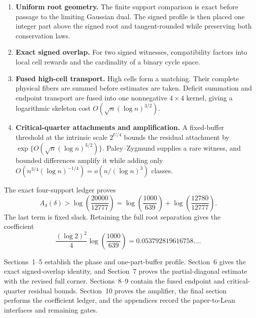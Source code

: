 \begin{enumerate}
\item \textbf{Uniform root geometry.} The finite support comparison is exact
before passage to the limiting Gaussian dual. The signed profile is then
placed one integer part above the signed root and tangent-rounded while
preserving both conservation laws.

\item \textbf{Exact signed overlap.} For two signed witnesses, compatibility
factors into local cell rewards and the cardinality of a binary cycle space.

\item \textbf{Fused high-cell transport.} High cells form a matching. Their
complete physical fibers are summed before estimates are taken. Deficit
summation and endpoint transport are fused into one nonnegative $4\times4$
kernel, giving a logarithmic skeleton cost
$O(\sqrt n(\log n)^{3/2})$.

\item \textbf{Critical-quarter attachments and amplification.} A fixed-buffer
threshold at the intrinsic scale $2^{U/4}$ bounds the residual attachment by
$\exp\{O(\sqrt n(\log n)^{3/2})\}$. Paley--Zygmund supplies a rare witness,
and bounded differences amplify it while adding only
$O(n^{3/4}(\log n)^{-1/4})=o(n/(\log n)^3)$ classes.
\end{enumerate}

The exact four-support ledger proves
\[
  A_4(\delta)
  >
  \log\!\left(\frac{20000}{12777}\right)
  =
  \log\!\left(\frac{1000}{639}\right)
  +
  \log\!\left(\frac{12780}{12777}\right).
\]
The last term is fixed slack. Retaining the full root separation gives the
coefficient
\[
  \frac{(\log 2)^2}{4}
  \log\!\left(\frac{1000}{639}\right)
  =0.053792819616758\ldots.
\]

Sections~1--5 establish the phase and one-part-buffer profile. Section~6 gives
the exact signed-overlap identity, and Section~7 proves the partial-diagonal
estimate with the revised full corner. Sections~8--9 contain the fused endpoint
and critical-quarter residual bounds. Section~10 proves the amplifier, the
final section performs the coefficient ledger, and the appendices record the
paper-to-Lean interfaces and remaining gates.
